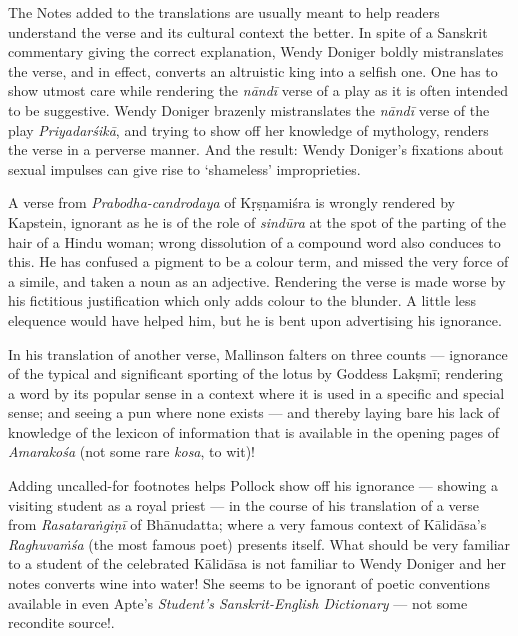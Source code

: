 The Notes added to the translations are usually meant to help readers understand the verse and its cultural context the better. In spite of a Sanskrit commentary giving the correct explanation, Wendy Doniger
 boldly mistranslates the verse, and in effect, converts an altruistic king into a selfish one. One has to show utmost care while rendering the \textsl{nāndī} verse of a play as it is often intended to be suggestive. Wendy Doniger brazenly mistranslates the \textsl{nāndī} verse of the play \textsl{Priyadarśikā}, and trying to show off her knowledge of mythology, renders the verse in a perverse manner. And the result: Wendy Doniger’s fixations about sexual impulses can give rise to ‘shameless’ improprieties.

A verse from \textsl{Prabodha-candrodaya} of Kṛṣṇamiśra is wrongly rendered by Kapstein, ignorant as he is of the role of \textsl{sindūra} at the spot of the parting of the hair of a Hindu woman; wrong dissolution of a compound word also conduces to this. He has confused a pigment to be a colour term, and missed the very force of a simile, and taken a noun as an adjective. Rendering the verse is made worse by his fictitious justification which only adds colour to the blunder. A little less elequence would have helped him, but he is bent upon advertising his ignorance.

In his translation of another verse, Mallinson falters on three counts --- ignorance of the typical and significant sporting of the lotus by Goddess Lakṣmī; rendering a word by its popular sense in a context where it is used in a specific and special sense; and seeing a pun where none exists --- and thereby laying bare his lack of knowledge of the lexicon of information that is available in the opening pages of \textsl{Amarakośa} (not some rare \textsl{kosa}, to wit)!

Adding uncalled-for footnotes helps Pollock show off his ignorance --- showing a visiting student as a royal priest --- in the course of his translation of a verse from \textsl{Rasataraṅgiṇī} of Bhānudatta; where a very famous context of Kālidāsa’s \textsl{Raghuvaṁśa} (the most famous poet) presents itself. What should be very familiar to a student of the celebrated Kālidāsa is not familiar to Wendy Doniger and her notes converts wine into water! She seems to be ignorant of poetic conventions available in even Apte’s \textsl{Student’s Sanskrit-English Dictionary} --- not some recondite source!.

